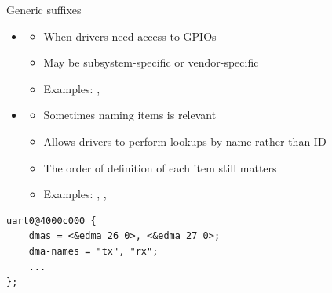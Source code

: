 \begin{frame}[fragile]{Generic suffixes}
  \begin{itemize}
  \item {}
    \begin{itemize}
    \item When drivers need access to GPIOs
    \item May be subsystem-specific or vendor-specific
    \item Examples: , 
    \end{itemize}
  \item {}
    \begin{itemize}
    \item Sometimes naming items is relevant
    \item Allows drivers to perform lookups by name rather than ID
    \item The order of definition of each item still matters
    \item Examples: , ,
    \end{itemize}
  \end{itemize}
  \begin{block}{}
    \begin{verbatim}
uart0@4000c000 {
    dmas = <&edma 26 0>, <&edma 27 0>;
    dma-names = "tx", "rx";
    ...
};
    \end{verbatim}
  \end{block}
\end{frame}


